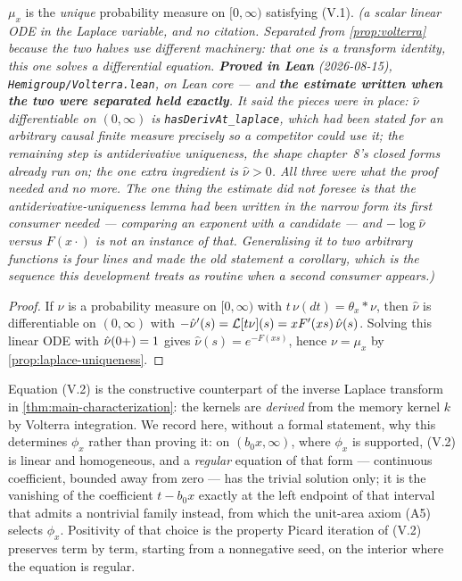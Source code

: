 \begin{proposition}\label{prop:volterra-uniqueness}
\leanok
$\mu_x$ is the \emph{unique} probability measure on $[0,\infty)$ satisfying (V.1).
\statusT\quad\emph{(a scalar linear ODE in the Laplace variable, and no citation. Separated from
\ref{prop:volterra} because the two halves use different machinery: that one is a transform
identity, this one solves a differential equation.
\textbf{Proved in Lean} (2026-08-15), \texttt{Hemigroup/Volterra.lean}, on Lean core
--- and \textbf{the estimate written when the two were separated held exactly}. It said the
pieces were in place: $\hat\nu$ differentiable on $(0,\infty)$ is
\texttt{hasDerivAt\_laplace}, which had been stated for an \emph{arbitrary} causal finite measure
precisely so a competitor could use it; the remaining step is antiderivative uniqueness, the shape
chapter~8's closed forms already run on; the one extra ingredient is $\hat\nu > 0$. All three were
what the proof needed and no more.
The one thing the estimate did not foresee is that the antiderivative-uniqueness lemma had been
written in the narrow form its first consumer needed --- comparing an exponent with a candidate
--- and $-\log\hat\nu$ versus $F(x\cdot)$ is not an instance of that. Generalising it to two
arbitrary functions is four lines and made the old statement a corollary, which is the sequence
this development treats as routine when a second consumer appears.)}
\end{proposition}

\begin{proof}
\leanok
If $\nu$ is a probability measure on $[0,\infty)$ with $t\,\nu(dt) = \theta_x * \nu$, then
$\hat\nu$ is differentiable on $(0,\infty)$ with
$-\hat\nu'(s) = \mathcal{L}[t\nu](s) = xF'(xs)\,\hat\nu(s)$. Solving this linear ODE with
$\hat\nu(0{+}) = 1$ gives $\hat\nu(s) = e^{-F(xs)}$, hence $\nu = \mu_x$ by
\ref{prop:laplace-uniqueness}.
\end{proof}

\bigskip

Equation (V.2) is the constructive counterpart of the inverse Laplace transform in
\ref{thm:main-characterization}: the kernels are \emph{derived} from the memory kernel $k$ by
Volterra integration. We record here, without a formal statement, why this determines $\phi_x$
rather than proving it: on $(b_0x, \infty)$, where $\phi_x$ is supported, (V.2) is linear and
homogeneous, and a \emph{regular} equation of that form --- continuous coefficient, bounded
away from zero --- has the trivial solution only; it is the vanishing of the coefficient
$t - b_0x$ exactly at the left endpoint of that interval that admits a nontrivial family
instead, from which the unit-area axiom (A5) selects $\phi_x$. Positivity of that choice is
the property Picard iteration of (V.2) preserves term by term, starting from a nonnegative
seed, on the interior where the equation is regular.


